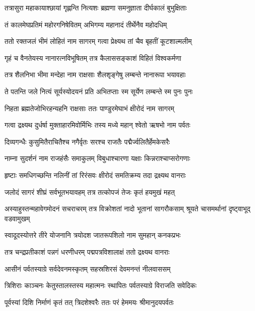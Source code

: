 \twolineshloka
{तत्रासुरा महाकायाश्छायां गृह्णन्ति नित्यशः}
{ब्रह्मणा समनुज्ञाता दीर्घकालं बुभुक्षिताः} %

\twolineshloka
{तं कालमेघप्रतिमं महोरगनिषेवितम्}
{अभिगम्य महानादं तीर्थेनैव महोदधिम्} %

\twolineshloka
{ततो रक्तजलं भीमं लोहितं नाम सागरम्}
{गत्वा प्रेक्ष्यथ तां चैव बृहतीं कूटशाल्मलीम्} %

\twolineshloka
{गृहं च वैनतेयस्य नानारत्नविभूषितम्}
{तत्र कैलाससङ्काशं विहितं विश्वकर्मणा} %

\twolineshloka
{तत्र शैलनिभा भीमा मन्देहा नाम राक्षसाः}
{शैलशृङ्गेषु लम्बन्ते नानारूपा भयावहाः} %

\twolineshloka
{ते पतन्ति जले नित्यं सूर्यस्योदयनं प्रति}
{अभितप्ताः स्म सूर्येण लम्बन्ते स्म पुनः पुनः} %

\twolineshloka
{निहता ब्रह्मतेजोभिरहन्यहनि राक्षसाः}
{ततः पाण्डुरमेघाभं क्षीरोदं नाम सागरम्} %

\twolineshloka
{गत्वा द्रक्ष्यथ दुर्धर्षा मुक्ताहारमिवोर्मिभिः}
{तस्य मध्ये महान् श्वेतो ऋषभो नाम पर्वतः} %

\twolineshloka
{दिव्यगन्धैः कुसुमितैराचितैश्च नगैर्वृतः}
{सरश्च राजतैः पद्मैर्ज्वलितैर्हेमकेसरैः} %

\twolineshloka
{नाम्ना सुदर्शनं नाम राजहंसैः समाकुलम्}
{विबुधाश्चारणा यक्षाः किन्नराश्चाप्सरोगणाः} %

\twolineshloka
{हृष्टाः समधिगच्छन्ति नलिनीं तां रिरंसवः}
{क्षीरोदं समतिक्रम्य तदा द्रक्ष्यथ वानराः} %

\twolineshloka
{जलोदं सागरं शीघ्रं सर्वभूतभयावहम्}
{तत्र तत्कोपजं तेजः कृतं हयमुखं महत्} %

\threelineshloka
{अस्याहुस्तन्महावेगमोदनं सचराचरम्}
{तत्र विक्रोशतां नादो भूतानां सागरौकसाम्}
{श्रूयते चासमर्थानां दृष्ट्वाभूद् वडवामुखम्} %

\twolineshloka
{स्वादूदस्योत्तरे तीरे योजनानि त्रयोदश}
{जातरूपशिलो नाम सुमहान् कनकप्रभः} %

\twolineshloka
{तत्र चन्द्रप्रतीकाशं पन्नगं धरणीधरम्}
{पद्मपत्रविशालाक्षं ततो द्रक्ष्यथ वानराः} %

\twolineshloka
{आसीनं पर्वतस्याग्रे सर्वदेवनमस्कृतम्}
{सहस्रशिरसं देवमनन्तं नीलवाससम्} %

\twolineshloka
{त्रिशिराः काञ्चनः केतुस्तालस्तस्य महात्मनः}
{स्थापितः पर्वतस्याग्रे विराजति सवेदिकः} %

\twolineshloka
{पूर्वस्यां दिशि निर्माणं कृतं तत् त्रिदशेश्वरैः}
{ततः परं हेममयः श्रीमानुदयपर्वतः} %

